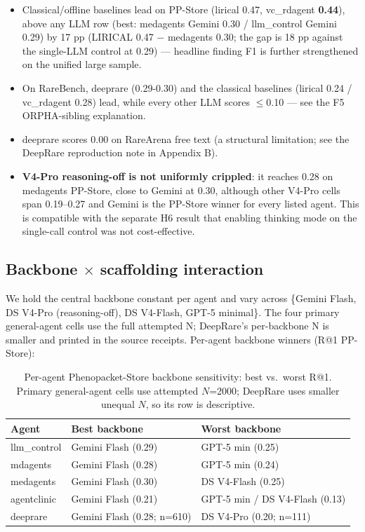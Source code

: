 \begin{itemize}
\tightlist
\item
  Classical/offline baselines lead on PP-Store (lirical 0.47, vc\_rdagent
  \textbf{0.44}), above any LLM row (best: medagents Gemini 0.30 / llm\_control
  Gemini 0.29) by 17 pp (LIRICAL 0.47 \ensuremath{-} medagents 0.30; the gap is 18 pp
  against the single-LLM control at 0.29) --- headline finding F1 is further
  strengthened on the unified large sample.
\item
  On RareBench, deeprare (0.29-0.30) and the classical baselines (lirical 0.24 /
  vc\_rdagent 0.28) lead, while every other LLM scores \ensuremath{\leq}0.10 --- see the F5
  ORPHA-sibling explanation.
\item
  deeprare scores 0.00 on RareArena free text (a structural limitation; see
  the DeepRare reproduction note in Appendix B).
\item
  \textbf{V4-Pro reasoning-off is not uniformly crippled}: it reaches 0.28 on
  medagents PP-Store, close to Gemini at 0.30, although other V4-Pro cells span
  0.19--0.27 and Gemini is the PP-Store winner for every listed agent. This is
  compatible with the separate  H6 result that enabling thinking mode on the
  single-call control was not cost-effective.
\end{itemize}

\subsection{Backbone \ensuremath{\times} scaffolding interaction}\label{sec-6-2}

We hold the central backbone constant per agent and vary across \{Gemini Flash,
DS V4-Pro (reasoning-off), DS V4-Flash, GPT-5 minimal\}. The four primary
general-agent cells use the full attempted N; DeepRare's per-backbone N is
smaller and printed in the source receipts.
Per-agent backbone winners (R@1 PP-Store):

\begin{table}[t]
\centering\scriptsize\setlength{\tabcolsep}{3.5pt}
\caption{Per-agent Phenopacket-Store backbone sensitivity: best vs.~worst R@1. Primary general-agent cells use attempted \(N\)=2000; DeepRare uses smaller unequal \(N\), so its row is descriptive.}\label{tbl:bbsens}
\begin{tabular}{@{}
lll@{}}
\toprule
Agent & Best backbone & Worst backbone \\
\midrule
llm\_control & Gemini Flash (0.29) & GPT-5 min (0.25) \\
mdagents & Gemini Flash (0.28) & GPT-5 min (0.24) \\
medagents & Gemini Flash (0.30) & DS V4-Flash (0.25) \\
agentclinic & Gemini Flash (0.21) & GPT-5 min / DS V4-Flash (0.13) \\
deeprare & Gemini Flash (0.28; n=610) & DS V4-Pro (0.20; n=111) \\
\bottomrule
\end{tabular}
\end{table}

